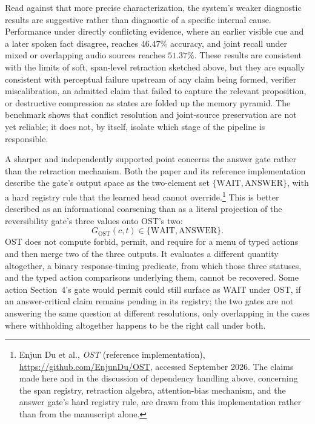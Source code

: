 \documentclass[11pt]{article}
\begin{document}
Read against that more precise characterization, the system's weaker diagnostic results are suggestive rather than diagnostic of a specific internal cause. Performance under directly conflicting evidence, where an earlier visible cue and a later spoken fact disagree, reaches $46.47\%$ accuracy, and joint recall under mixed or overlapping audio sources reaches $51.37\%$. These results are consistent with the limits of soft, span-level retraction sketched above, but they are equally consistent with perceptual failure upstream of any claim being formed, verifier miscalibration, an admitted claim that failed to capture the relevant proposition, or destructive compression as states are folded up the memory pyramid. The benchmark shows that conflict resolution and joint-source preservation are not yet reliable; it does not, by itself, isolate which stage of the pipeline is responsible.

A sharper and independently supported point concerns the answer gate rather than the retraction mechanism. Both the paper and its reference implementation describe the gate's output space as the two-element set $\{\mathrm{WAIT}, \mathrm{ANSWER}\}$, with a hard registry rule that the learned head cannot override.\footnote{Enjun Du et al., \textit{OST} (reference implementation), \url{https://github.com/EnjunDu/OST}, accessed September 2026. The claims made here and in the discussion of dependency handling above, concerning the span registry, retraction algebra, attention-bias mechanism, and the answer gate's hard registry rule, are drawn from this implementation rather than from the manuscript alone.} This is better described as an informational coarsening than as a literal projection of the reversibility gate's three values onto OST's two:
\[
G_{\mathrm{OST}}(c, t) \in \{\mathrm{WAIT}, \mathrm{ANSWER}\}.
\]
OST does not compute forbid, permit, and require for a menu of typed actions and then merge two of the three outputs. It evaluates a different quantity altogether, a binary response-timing predicate, from which those three statuses, and the typed action comparisons underlying them, cannot be recovered. Some action Section~4's gate would permit could still surface as WAIT under OST, if an answer-critical claim remains pending in its registry; the two gates are not answering the same question at different resolutions, only overlapping in the cases where withholding altogether happens to be the right call under both.
\end{document}
